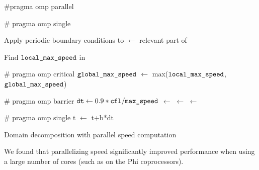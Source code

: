 \begin{algorithm}[hh]
\begin{algorithmic}[1]
\item \#pragma omp parallel
    \item \# pragma omp single
    \item Apply periodic boundary conditions to 
    \State {} $\gets$ relevant part of 
    \item Find $\texttt{local\_max\_speed}$ in 
    \item \# pragma omp critical
    \State $\texttt{global\_max\_speed}$ $\gets$ max($\texttt{local\_max\_speed}$,$\texttt{global\_max\_speed}$)
    \item \# pragma omp barrier
    \State $\texttt{dt} \gets 0.9*\texttt{cfl} / \texttt{max\_speed}$
    	\State {} $\gets$  
    	\State {} $\gets$ 
    \EndFor
    \State {} $\gets$ 
    \item \# pragma omp single
    \State t $\gets$ t+b*dt
\EndWhile
\end{algorithmic}
\caption{Domain decomposition with parallel speed computation}
\label{alg:a2}
\end{algorithm}

We found that parallelizing speed significantly improved performance when using a large number of cores (such as on the Phi coprocessors).

\newpage
